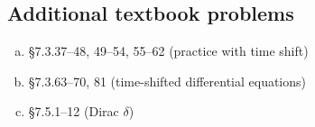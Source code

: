 \subsection*{Additional textbook problems}

\begin{enumerate}[(a)]
\item {} \S 7.3.37--48, 49--54, 55--62 (practice with time shift)
\item {} \S 7.3.63--70, 81 (time-shifted differential equations)
\item {} \S 7.5.1--12 (Dirac \(\delta\))
\end{enumerate}
